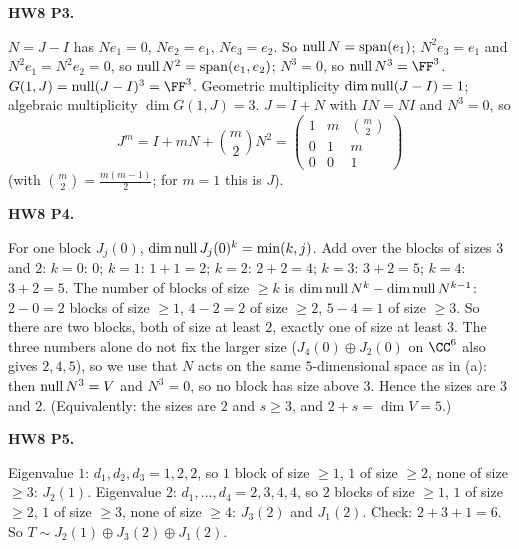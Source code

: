 \documentclass[10pt]{scrartcl}
\begin{document}
\begin{prob}
\textbf{HW8 P3. }\par 
\begin{enumerate}[(a)]
  \ii $N=J-I$ has $Ne_1=0$, $Ne_2=e_1$, $Ne_3=e_2$. So $\operatorname{null} N=\operatorname{span}(e_1)$; $N^2e_3=e_1$ and $N^2e_1=N^2e_2=0$, so $\operatorname{null} N^2=\operatorname{span}(e_1,e_2)$; $N^3=0$, so $\nul N^3=\FF^3$.
  \ii $G(1,J)=\nul(J-I)^3=\FF^3$. Geometric multiplicity $\dim\operatorname{null}(J-I)=1$; algebraic multiplicity $\dim G(1,J)=3$.
  \ii {}$J=I+N$ with $IN=NI$ and $N^3=0$, so
  \[
    J^m=I+mN+\binom m2N^2=\begin{pmatrix}1&m&\binom m2\\0&1&m\\0&0&1\end{pmatrix}
  \]
  (with $\binom m2=\frac{m(m-1)}2$; for $m=1$ this is $J$).
\end{enumerate}
\end{prob}

\begin{prob}
\textbf{HW8 P4. }\par 
\begin{enumerate}[(a)]
  \ii {}For one block $J_j(0)$, $\dim\operatorname{null} J_j(0)^k=\min(k,j)$. Add over the blocks of sizes $3$ and $2$: $k=0$: $0$; $k=1$: $1+1=2$; $k=2$: $2+2=4$; $k=3$: $3+2=5$; $k=4$: $3+2=5$.
  \ii {}The number of blocks of size $\ge k$ is $\dim\operatorname{null} N^k-\dim\operatorname{null} N^{k-1}$: $2-0=2$ blocks of size $\ge1$, $4-2=2$ of size $\ge2$, $5-4=1$ of size $\ge3$. So there are two blocks, both of size at least $2$, exactly one of size at least $3$. The three numbers alone do not fix the larger size ($J_4(0)\oplus J_2(0)$ on $\CC^6$ also gives $2,4,5$), so we use that $N$ acts on the same $5$-dimensional space as in (a): then $\operatorname{null} N^3=V$ and $N^3=0$, so no block has size above $3$. Hence the sizes are $3$ and $2$. (Equivalently: the sizes are $2$ and $s\ge3$, and $2+s=\dim V=5$.)
\end{enumerate}
\end{prob}

\begin{prob}
\textbf{HW8 P5. }\par 
{}Eigenvalue $1$: $d_1,d_2,d_3=1,2,2$, so $1$ block of size $\ge1$, $1$ of size $\ge2$, none of size $\ge3$: $J_2(1)$. Eigenvalue $2$: $d_1,\dots,d_4=2,3,4,4$, so $2$ blocks of size $\ge1$, $1$ of size $\ge2$, $1$ of size $\ge3$, none of size $\ge4$: $J_3(2)$ and $J_1(2)$. Check: $2+3+1=6$. So $T\sim J_2(1)\oplus J_3(2)\oplus J_1(2)$.
\end{prob}
\end{document}
